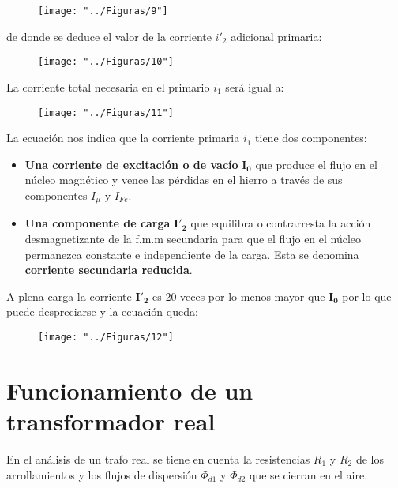 \begin{figure}[H]
	\centering
	\texttt{[image: "../Figuras/9"]}
\end{figure} 

de donde se deduce el valor de la corriente $i'_{2}$ adicional primaria:

\begin{figure}[H]
	\centering
	\texttt{[image: "../Figuras/10"]}
\end{figure} 

La corriente total necesaria en el primario $i_{1}$ será igual a:

\begin{figure}[H]
	\centering
	\texttt{[image: "../Figuras/11"]}
\end{figure} 

La ecuación nos indica que la corriente primaria $i_{1}$ tiene dos componentes:

\begin{itemize}
	\item \textbf{Una corriente de excitación o de vacío} $\mathbf{I_{0}}$ que produce el flujo en el núcleo magnético y vence las pérdidas en el hierro a través de sus componentes $I_{\mu}$ y $I_{Fe}$.
	\item \textbf{Una componente de carga} $\mathbf{I'_{2}}$ que equilibra o contrarresta la acción desmagnetizante de la f.m.m secundaria para que el flujo en el núcleo permanezca constante e independiente de la carga. Esta se denomina \textbf{corriente secundaria reducida}.
\end{itemize}

A plena carga la corriente $\mathbf{I'_{2}}$ es 20 veces por lo menos mayor que $\mathbf{I_{0}}$ por lo que puede despreciarse y la ecuación queda:

\begin{figure}[H]
	\centering
	\texttt{[image: "../Figuras/12"]}
\end{figure} 

\section{Funcionamiento de un transformador real}

En el análisis de un trafo real se tiene en cuenta la resistencias $R_{1}$ y $R_{2}$ de los arrollamientos y los flujos de dispersión $\Phi_{d1}$ y $\Phi_{d2}$ que se cierran en el aire.

